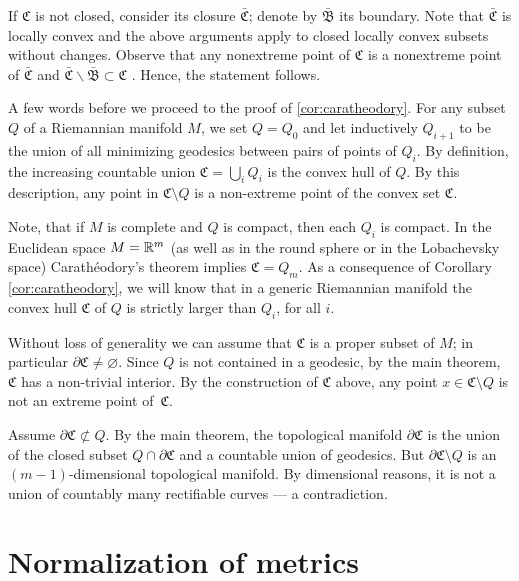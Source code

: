 \documentclass[a4paper,10pt]{article}
\begin{document}
If $\mathfrak C$ is not closed, consider its closure $\bar {\mathfrak C}$;
denote by $\bar{\mathfrak{B}}$ its boundary.
Note that $\bar{\mathfrak C}$ is locally convex and the above arguments apply to closed locally convex subsets without changes.
Observe that any nonextreme point of $\mathfrak{C}$ is a  nonextreme point of $\bar{\mathfrak{C}}$ and $\bar{\mathfrak{C}}\backslash\bar{\mathfrak{B}}\subset\mathfrak{C}$ \cite[Lemma 1.5]{cheeger-gromoll}.
Hence, the statement follows.
\qeds


A few words before we proceed to the proof of  \ref{cor:caratheodory}.  For any subset $Q$ of a Riemannian manifold $M$,
we set $Q=Q_0$ and let inductively $Q_{i+1}$ to be the union of all minimizing geodesics between pairs of points of $Q_i$.
By definition, the increasing countable union $\mathfrak{C}= \bigcup_iQ_i$ is the convex hull of $Q$.  
By this description, any point in $\mathfrak{C} \setminus Q$ is a non-extreme point of the convex set $\mathfrak {C}$.

Note, that if $M$ is complete and $Q$ is compact, then each $Q_i$ is  compact.
In the Euclidean space $M=\mathbb{R}^m$  (as well as in the round sphere or in the Lobachevsky space) Carath\'eodory's theorem \cite{Handbook} implies $\mathfrak{C} =Q_m$.
As a consequence of Corollary \ref{cor:caratheodory}, we will know that in a generic Riemannian manifold the convex hull $\mathfrak{C}$ of $Q$ is strictly larger than  $Q_i$, for all $i$.






Without loss of generality we can assume that $\mathfrak{C}$ is a proper subset of $M$; in particular $\partial\mathfrak{C}\ne \varnothing$.
Since $Q$ is not contained in a geodesic, by the main theorem, $\mathfrak{C}$ has a non-trivial interior.
By the construction of $\mathfrak{C}$ above, any point $x\in \mathfrak{C} \setminus Q$ is not an extreme point of~$\mathfrak{C}$.

Assume $\partial \mathfrak{C} \not\subset Q$.
By the main theorem, the topological manifold $\partial \mathfrak{C}$ is the union of the closed subset $Q\cap \partial \mathfrak{C}$ and a countable union of geodesics.
But $\partial \mathfrak{C} \setminus Q$ is an $(m-1)$-dimensional topological manifold.
By dimensional reasons,  it is not a union of countably many rectifiable  curves --- a contradiction.
\qeds

\appendix

\section{Normalization of metrics}
\label{sec:normalization}
\end{document}
